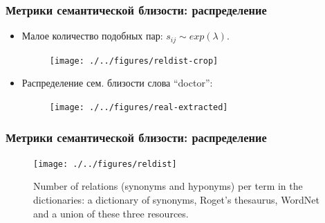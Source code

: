 


\begin{frame}
\frametitle{Метрики семантической близости: распределение}
\begin{itemize}

\item Малое количество подобных пар:
$s_{ij} \sim exp(\lambda)$.

\begin{figure}
\centering
\texttt{[image: ./../figures/reldist-crop]}
\end{figure}

\item Распределение сем. близости слова ``doctor'':

\begin{figure}
\centering
\texttt{[image: ./../figures/real-extracted]}
\end{figure} 

\end{itemize}
\end{frame}





\begin{frame}
\frametitle{Метрики семантической близости: распределение}
\begin{figure}
\centering
\texttt{[image: ./../figures/reldist]}
\caption{ Number of relations (synonyms and hyponyms) per term in the dictionaries: a dictionary of synonyms, Roget's thesaurus, WordNet and a union of these three resources.  }
\label{fig:sim-distribution}
\end{figure}

\end{frame}




